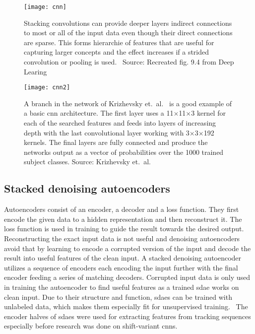 \begin{figure}[H]
\centering
\texttt{[image: cnn]}
\caption{Stacking convolutions can provide deeper layers indirect connections to
         most or all of the input data even though their direct connections are sparse.
         This forms hierarchie of features that are useful for capturing larger concepts
         and the effect increases if a strided convolution or pooling is used.~\cite{DEEP_LEARNING}
         Source: Recreated fig. 9.4 from Deep Learing~\cite{DEEP_LEARNING}}\label{fig:scon}
\end{figure}

\begin{figure}[H]
\centering
\texttt{[image: cnn2]}
\caption{A branch in the network of Krizhevsky et.~al.~\cite{NIPS_IMAGENET} is a good example
         of a basic \ac{cnn} architecture. The first layer uses a 11$\times$11$\times$3
         kernel for each of the searched features and feeds into layers of increasing depth
         with the last convolutional layer working with 3$\times$3$\times$192 kernels. The
         final layers are fully connected and produce the networks output as a vector of
         probabilities over the 1000 trained subject classes. Source: Krizhevsky et.~al.~\cite{NIPS_IMAGENET}}\label{fig:cnn}
\end{figure}

\subsection{Stacked denoising autoencoders}
Autoencoders consist of an encoder, a decoder and a loss function. They first encode the
given data to a hidden representation and then reconstruct it. The loss function is
used in training to guide the result towards the desired output. Reconstructing the
exact input data is not useful and denoising autoencoders avoid that by learning to
encode a corrupted version of the input and decode the result into useful features of
the clean input. A stacked denoising autoencoder utilizes a sequence of encoders each
encoding the input further with the final encoder feeding a series of matching decoders.
Corrupted input data is only used in training the autoencoder to find useful features as
a trained \ac{sdae} works on clean input. Due to their structure and function, \ac{sdae}s
can be trained with unlabeled data, which makes them especially fit for unsupervised
training.~\cite{SDAE} The encoder halves of \ac{sdae}s were used for extracting features
from tracking sequences especially before research was done on shift-variant \ac{cnn}s.
